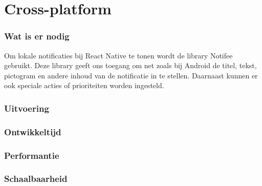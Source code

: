 

\clearpage
\section{Cross-platform}
\subsubsection{Wat is er nodig}
Om lokale notificaties bij React Native te tonen wordt de library Notifee gebruikt.
Deze library geeft ons toegang om net zoals bij Android de titel, tekst, pictogram en 
andere inhoud van de notificatie in te stellen. Daarnaast kunnen er ook speciale acties 
of prioriteiten worden ingesteld.

\subsubsection{Uitvoering}



\subsubsection{Ontwikkeltijd}



\subsubsection{Performantie}



\subsubsection{Schaalbaarheid}



